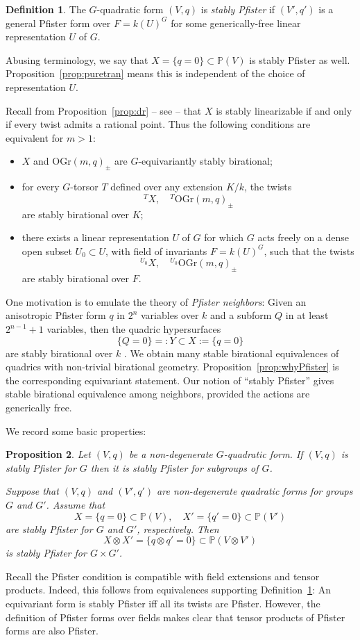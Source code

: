 \documentclass[12pt]{amsart}
\numberwithin{equation}{section}
\newcommand{\bP}{\mathbb{P}}
\newcommand{\OGr}{\mathrm{OGr}}
\theoremstyle{plain}
\newtheorem{prop}{Proposition}[section]
\theoremstyle{definition}
\newtheorem{defi}[prop]{Definition}
\theoremstyle{remark}
\begin{document}
\begin{defi} \label{defi:stabPfister}
The $G$-quadratic form $(V,q)$ is {\em stably Pfister} if
$(V',q')$ is a general Pfister form over $F=k(U)^G$
for some generically-free linear representation $U$ of $G$.
\end{defi}
Abusing terminology, we say that $X=\{q=0 \}\subset \bP(V)$
is stably Pfister as well.
Proposition~\ref{prop:puretran} means this is 
independent of the choice of representation $U$.



Recall from Proposition~\ref{prop:dr} -- see \cite[\S 10]{DR} -- that $X$ is stably linearizable if and only if every twist admits a rational point. Thus the following conditions are equivalent
for $m>1$:
\begin{itemize} 
\item[(1)] $X$ and $\OGr(m,q)_{\pm}$ are $G$-equivariantly stably birational;
\item[(2)] for every $G$-torsor $T$
defined over any extension $K/k$, the twists
$${ }^T X,\quad  { }^T\OGr(m,q)_{\pm}$$
are stably birational over $K$;
\item[(3)] there exists a linear representation
$U$ of $G$ for which $G$ acts freely on a dense open subset
$U_0 \subset U$, with field of invariants $F=k(U)^G$,
such that the twists
$$
{ }^{U_0} X,\quad  { }^{U_0}\OGr(m,q)_{\pm}
$$
are stably birational over $F$.
\end{itemize}

One motivation is to emulate the theory of {\em Pfister neighbors}:
Given an anisotropic Pfister form $q$ in $2^n$ variables over $k$ 
and a subform $Q$ in at least $2^{n-1}+1$ variables, then the quadric hypersurfaces
$$\{Q=0\} =:Y \subset X:= \{q=0\}$$
are stably birational over $k$ \cite[23.10]{EKMbook}.  
We obtain many stable birational
equivalences of quadrics with non-trivial birational geometry.
Proposition~\ref{prop:whyPfister} is the corresponding
equivariant statement.
Our notion of ``stably Pfister'' gives stable birational
equivalence among neighbors, provided the
actions are generically free. 

We record some basic properties:
\begin{prop} \label{prop:stabpfisbasic}
Let $(V,q)$ be a non-degenerate $G$-quadratic form.
If $(V,q)$ is stably Pfister for $G$ then it is stably
Pfister for subgroups of $G$.  

Suppose that $(V,q)$ and $(V',q')$ are non-degenerate
quadratic forms for groups $G$ and $G'$.
Assume that 
$$
X=\{q=0\} \subset \bP(V), \quad
X'=\{q'=0\} \subset \bP(V')
$$ 
are stably Pfister for $G$ and $G'$, respectively. 
Then 
$$
X \otimes X' = \{q\otimes q'=0\} \subset \bP(V\otimes V')
$$
is stably Pfister for $G\times G'$.
\end{prop}
Recall the Pfister condition is compatible with field
extensions and tensor products. 
Indeed, this follows from equivalences supporting
Definition~\ref{defi:stabPfister}: An equivariant form
is stably Pfister iff all its twists are Pfister. 
However, the definition of Pfister forms over fields
\cite[\S 4.B]{EKMbook} makes clear that tensor products of Pfister forms are also Pfister. 
\end{document}
